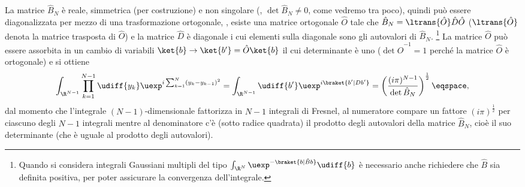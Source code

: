 La matrice $\hat{B}_{N}$ \`e reale, simmetrica (per costruzione) e non singolare (\ie,
$\det\hat{B}_{N} \neq 0$, come vedremo tra poco), quindi pu\`o essere
diagonalizzata per mezzo di una trasformazione ortogonale, \ie, 
esiste una matrice ortogonale $\hat{O}$ tale che  $\hat{B}_{N} =
\ltrans{\hat{O}} \hat{D} \hat{O}$  ($\ltrans{\hat{O}}$ denota la matrice
trasposta di $\hat{O}$) e la matrice $\hat{D}$ \`e diagonale i cui
elementi sulla 
diagonale sono gli autovalori di $\hat{B}_{N}$.%
\footnote{Quando si considera integrali Gaussiani multipli del tipo
$\int_{\R^{N}} \uexp^{ - \braket{ b | \hat{B} b} } \udiff{b}$
\`e necessario anche richiedere che $\hat{B}$ sia definita positiva,  
per poter assicurare la convergenza dell'integrale.}
La matrice $\hat{O}$ pu\`o essere assorbita in un cambio di variabili $\ket{b}
\rightarrow \ket{b'} = \hat{O} \ket{b} $ il cui determinante \`e uno ($\det
\hat{O}^{-1} = 1$
perch\'e la matrice $\hat{O}$ \`e ortogonale) e  si ottiene
\begin{equation}\label{eq:pl}
\int_{\R^{N-1}} \prod_{k=1}^{N-1} \udiff{y_{k}} \uexp^{ i \sum_{k=1}^{N} \left(
y_{k} - y_{k-1} \right)^{2}} = 
\int_{\R^{N-1} } \udiff{b'}  
\uexp^{ i \braket{b' | D  b'}}   
= \left( \frac{(i\pi)^{N-1}}{\det
\hat{B}_{N}} \right)^{\frac{1}{2}} \eqspace, 
\end{equation}
dal momento che l'integrale 
$(N-1)$-dimensionale 
fattorizza in $N-1$ integrali di Fresnel, al numeratore
compare  un
fattore 
$(i\pi)^{\frac{1}{2}}$  per ciascuno degli $N-1$ integrali
mentre al denominatore c'\`e (sotto radice quadrata) il prodotto degli autovalori della matrice $\hat{B}_{N}$,
cio\`e il suo determinante (che \`e uguale al prodotto degli autovalori).

